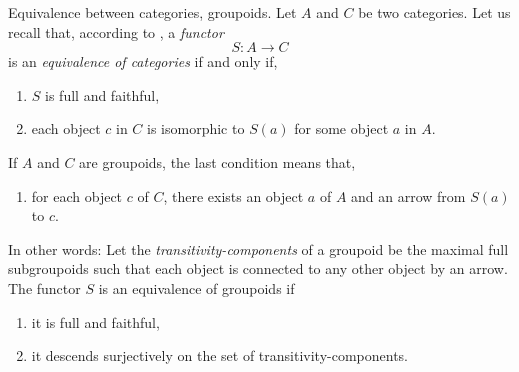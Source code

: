 \begin{Article}{Equivalence between categories, groupoids.}{}
  \label{art-Equivalence-between-categories-groupoids}
  Let $A$ and $C$ be two categories.
  Let us recall that,
  according to \cite[Chap.4\,\textsection\,4 Thm.\,1]{McL71},
  a \emph{functor}
  $$
    S \colon A \to C
  $$
  is an \emph{equivalence of categories} if and only if,
  \begin{enumerate}
    \item $S$ is full and faithful,
    \item each object $c$ in $C$ is isomorphic to $S(a)$ for some object $a$ in $A$.
  \end{enumerate}
  If $A$ and $C$ are groupoids,
  the last condition means that,
  \begin{enumerate}
    \item[(2')] for each object $c$ of $C$,
    there exists an object $a$ of $A$ and an arrow from $S(a)$ to $c$.
  \end{enumerate}
  In other words:
  Let the \emph{transitivity-components} of a groupoid be the maximal full subgroupoids such that each object is connected to any other object by an arrow.
  The functor $S$ is an equivalence of groupoids if
  \begin{enumerate}
    \item it is  full and faithful,
    \item it descends surjectively on the set of transitivity-components.
  \end{enumerate}
  \begin{center}
  \end{center}
\end{Article}


